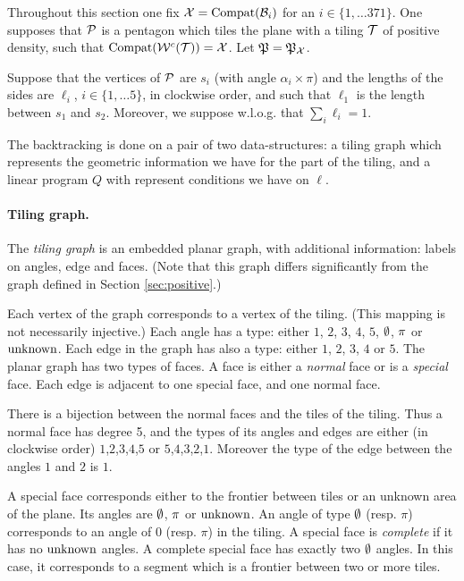 \documentclass[11pt]{article}
\theoremstyle{definition}
\begin{document}
\medskip

Throughout this section one fix $\mathcal{X}=\operatorname{Compat}(\mathcal{B}_i)$ for an $i\in\{1,\ldots 371\}$.
%
One supposes that $\mathcal{P}$ is a pentagon which tiles the plane with a tiling $\mathcal{T}$ of positive density, such that $\operatorname{Compat}({{\mathcal{W}}^c}(\mathcal{T}))=\mathcal{X}$. %
%
Let $\mathfrak{P} = \mathfrak{P}_{\mathcal{X}}$.

Suppose that the vertices of $\mathcal{P}$ are $s_i$ (with angle $\alpha_i\times \pi$) and the lengths of the sides are $\ell_i$, $i\in\{1,\ldots 5\}$, in clockwise order, and such that $\ell_1$ is the length between $s_1$ and $s_2$. Moreover, we suppose w.l.o.g. that $\sum_i \ell_i=1$.

%

\medskip

The backtracking is done on a pair of two data-structures:
a tiling graph which represents the geometric information we have for the part of the tiling,
and a linear program $Q$ with represent conditions we have on $\ell$.

\paragraph{Tiling graph.}
The \emph{tiling graph} is an embedded planar graph, with additional information: labels on angles, edge and faces.
(Note that this graph differs significantly from the graph defined in Section \ref{sec:positive}.)

Each vertex of the graph corresponds to a vertex of the tiling. (This mapping is not necessarily injective.)
Each angle has a type: either $1$, $2$, $3$, $4$, $5$, $\emptyset$, $\pi$ or $\operatorname{unknown}$.
Each edge in the graph has also a type: either $1$, $2$, $3$, $4$ or $5$.
The planar graph has two types of faces. A face is either a \emph{normal} face or is a \emph{special} face.
Each edge is adjacent to one special face, and one normal face.

There is a bijection between the normal faces and the tiles of the tiling. %
Thus a normal face has degree 5, and the types of its angles and edges are either (in clockwise order) $1$,$2$,$3$,$4$,$5$ or $5$,$4$,$3$,$2$,$1$. Moreover the type of the edge between the angles $1$ and $2$ is $1$.
%

A special face corresponds either to the frontier between tiles or an unknown area of the plane.
Its angles are $\emptyset$, $\pi$ or $\operatorname{unknown}$. An angle of type $\emptyset$ (resp. $\pi$) corresponds to an angle of $0$ (resp. $\pi$) in the tiling.
A special face is \emph{complete} if it has no $\operatorname{unknown}$ angles.
A complete special face has exactly two $\emptyset$ angles. In this case, it corresponds to a segment which is a frontier between two or more tiles.
\end{document}
